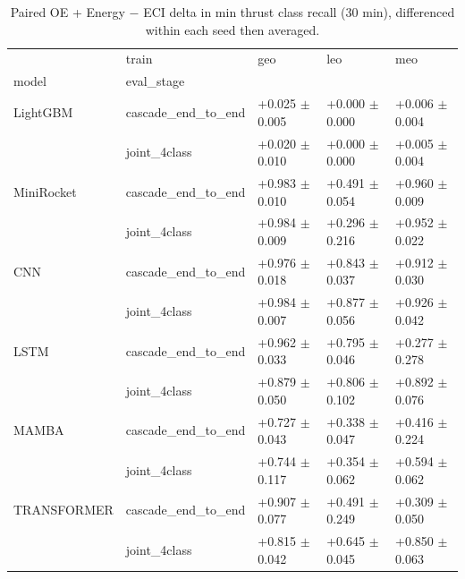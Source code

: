 \begin{table}
\centering
\caption{Paired OE + Energy $-$ ECI delta in min thrust class recall (30 min), differenced within each seed then averaged.}
\label{tab:featdelta_minrec_phys}
\begin{tabular}{lllll}
\toprule
            & train &                 geo &                 leo &                 meo \\
model & eval_stage &                     &                     &                     \\
\midrule
LightGBM & cascade_end_to_end &  +0.025 $\pm$ 0.005 &  +0.000 $\pm$ 0.000 &  +0.006 $\pm$ 0.004 \\
            & joint_4class &  +0.020 $\pm$ 0.010 &  +0.000 $\pm$ 0.000 &  +0.005 $\pm$ 0.004 \\
MiniRocket & cascade_end_to_end &  +0.983 $\pm$ 0.010 &  +0.491 $\pm$ 0.054 &  +0.960 $\pm$ 0.009 \\
            & joint_4class &  +0.984 $\pm$ 0.009 &  +0.296 $\pm$ 0.216 &  +0.952 $\pm$ 0.022 \\
CNN & cascade_end_to_end &  +0.976 $\pm$ 0.018 &  +0.843 $\pm$ 0.037 &  +0.912 $\pm$ 0.030 \\
            & joint_4class &  +0.984 $\pm$ 0.007 &  +0.877 $\pm$ 0.056 &  +0.926 $\pm$ 0.042 \\
LSTM & cascade_end_to_end &  +0.962 $\pm$ 0.033 &  +0.795 $\pm$ 0.046 &  +0.277 $\pm$ 0.278 \\
            & joint_4class &  +0.879 $\pm$ 0.050 &  +0.806 $\pm$ 0.102 &  +0.892 $\pm$ 0.076 \\
MAMBA & cascade_end_to_end &  +0.727 $\pm$ 0.043 &  +0.338 $\pm$ 0.047 &  +0.416 $\pm$ 0.224 \\
            & joint_4class &  +0.744 $\pm$ 0.117 &  +0.354 $\pm$ 0.062 &  +0.594 $\pm$ 0.062 \\
TRANSFORMER & cascade_end_to_end &  +0.907 $\pm$ 0.077 &  +0.491 $\pm$ 0.249 &  +0.309 $\pm$ 0.050 \\
            & joint_4class &  +0.815 $\pm$ 0.042 &  +0.645 $\pm$ 0.045 &  +0.850 $\pm$ 0.063 \\
\bottomrule
\end{tabular}
\end{table}

